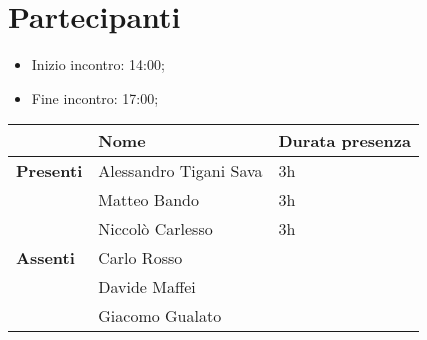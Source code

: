 \section{Partecipanti}

\begin{itemize}
    \item Inizio incontro: 14:00;
    \item Fine incontro: 17:00;
\end{itemize}


\begin{center}
{\renewcommand{\arraystretch}{1.5}
\begin{tabular}{lll}
	                    & \textbf{Nome}  & \textbf{Durata presenza} 	\\
	\hline
	\textbf{Presenti}   & Alessandro Tigani Sava	& 3h     \\
						& Matteo Bando				& 3h		\\
						& Niccolò Carlesso			& 3h		\\
	\hline
	\textbf{Assenti}	& Carlo Rosso				&			\\
						& Davide Maffei             &	        \\
						& Giacomo Gualato			&			\\
\end{tabular}	
}
\end{center}